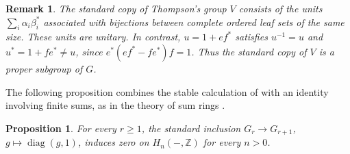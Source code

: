 \documentclass[10pt,a4paper]{amsart}
\newcommand{\Z}{\mathbb Z}
\newtheorem{proposition}[theorem]{Proposition}
\newtheorem{remark}[theorem]{Remark}
\numberwithin{equation}{section}
\begin{document}
\begin{remark}\label{rem:proper-standard-V}
The standard copy of Thompson's group $V$ consists of the units $\sum_i\alpha_i\beta_i^*$ associated with bijections between complete ordered leaf sets of the same size. These units are unitary. In contrast, $u=1+ef^*$ satisfies $u^{-1}=u$ and $u^*=1+fe^*\ne u$, since $e^*(ef^*-fe^*)f=1$. Thus the standard copy of $V$ is a proper subgroup of $G$.
\end{remark}

The following proposition combines the stable calculation of \cite{ABC09} with an identity involving finite sums, as in the theory of sum rings \cite[\S2]{Wagoner72}.

\begin{proposition}\label{prop:zero-padding}
For every $r\geq1$, the standard inclusion $G_r\to G_{r+1}$, $g\mapsto\operatorname{diag}(g,1)$, induces zero on $H_n(-,\Z)$ for every $n>0$.
\end{proposition}
\end{document}
